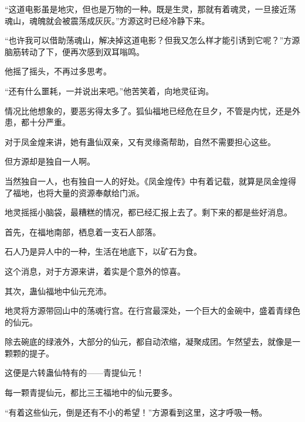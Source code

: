 \begin{this_body}
“这道电影虽是地灾，但也是万物的一种。既是生灵，那就有着魂灵，一旦接近荡魂山，魂魄就会被震荡成灰灰。”方源这时已经冷静下来。

“也许我可以借助荡魂山，解决掉这道电影？但我又怎么样才能引诱到它呢？”方源脑筋转动了下，便再次感到双耳嗡鸣。

他摇了摇头，不再过多思考。

“还有什么噩耗，一并说出来吧。”他苦笑着，向地灵征询。

情况比他想象的，要恶劣得太多了。狐仙福地已经危在旦夕，不管是内忧，还是外患，都十分严重。

对于凤金煌来讲，她有蛊仙双亲，又有灵缘斋帮助，自然不需要担心这些。

但方源却是独自一人啊。

当然独自一人，也有独自一人的好处。《凤金煌传》中有着记载，就算是凤金煌得了福地，也将大量的资源奉献给门派。

地灵摇摇小脑袋，最糟糕的情况，都已经汇报上去了。剩下来的都是些好消息。

首先，在福地南部，栖息着一支石人部落。

石人乃是异人中的一种，生活在地底下，以矿石为食。

这个消息，对于方源来讲，着实是个意外的惊喜。

其次，蛊仙福地中仙元充沛。

地灵将方源带回山中的荡魂行宫。在行宫最深处，一个巨大的金碗中，盛着青绿色的仙元。

除去碗底的绿液外，大部分的仙元，都自动浓缩，凝聚成团。乍然望去，就像是一颗颗的提子。

这便是六转蛊仙特有的——青提仙元！

每一颗青提仙元，都比三王福地中的仙元要多。

“有着这些仙元，倒是还有不小的希望！”方源看到这里，这才呼吸一畅。

\end{this_body}

